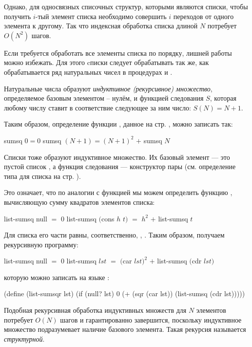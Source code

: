 Однако, для односвязных списочных структур, которыми являются списки, чтобы получить $i$-тый элемент списка необходимо совершить $i$ переходов от одного элемента к другому. Так что индексная обработка списка длиной $N$ потребует $O(N^2)$ шагов.

Если требуется обработать все элементы списка по порядку, лишней работы можно избежать. Для этого cписки следует обрабатывать так же, как обрабатывается ряд натуральных чисел в процедурах  и . 

Натуральные числа образуют \emph{индуктивное (рекурсивное) множество}, определяемое базовым элементом -- нулём, и функцией следования $S$, которая любому числу ставит в соответствие следующее за ним число: $S(N)=N+1$. 

Таким образом, определение функции , данное на стр. \pageref{sumsq}, можно записать так:

\begin{SchemeCode}
  sumsq $0 = 0$
  sumsq $(N + 1) = (N+1)^2$ $+$ sumsq $N$
\end{SchemeCode}

Списки тоже образуют индуктивное множество. Их базовый элемент --- это пустой список , а функция следования --- конструктор пары  (см. определение типа для списка на стр. \pageref{list-type}).

Это означает, что по аналогии с функцией  мы можем определить функцию , вычисляющую сумму квадратов элементов списка:

\begin{SchemeCode}
  list-sumsq null $=$ $0$
  list-sumsq $($cons $h$ $t)$ $=$ $h^2$ $+$ list-sumsq $t$
\end{SchemeCode}

Для списка  его части равны, соответственно, , . Таким образом, получаем рекурсивную программу:

\begin{SchemeCode}
  list-sumsq null $=$ $0$
  list-sumsq $lst$ $=$ $($car $lst)^2$ $+$ list-sumsq $($cdr $lst)$
\end{SchemeCode}
которую можно записать на языке \Scheme:
\begin{SchemeCode}[emph={lst}]
(define (list-sumsqr lst)
  (if (null? lst)
      0
      (+ (sqr (car lst)) (list-sumsq (cdr lst)))))
\end{SchemeCode}

Подобная рекурсивная обработка индуктивных множеств для $N$ элементов потребует $O(N)$ шагов и гарантированно завершится, поскольку индуктивное множество подразумевает наличие базового элемента. Такая рекурсия называется \emph{структурной}.


